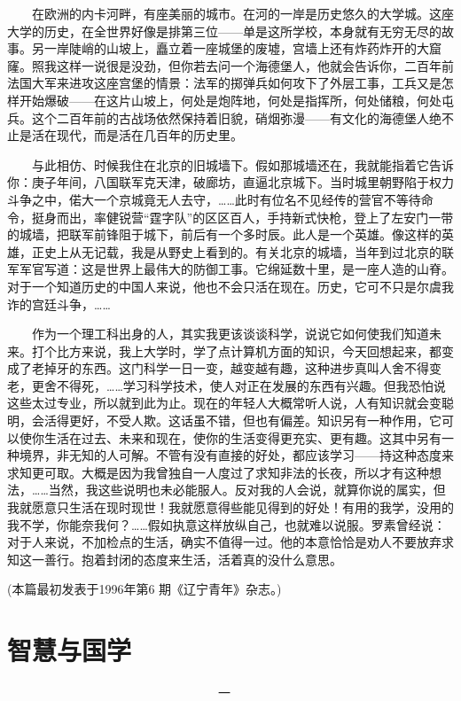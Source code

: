 　　在欧洲的内卡河畔，有座美丽的城市。在河的一岸是历史悠久的大学城。这座大学的历史，在全世界好像是排第三位——单是这所学校，本身就有无穷无尽的故事。另一岸陡峭的山坡上，矗立着一座城堡的废墟，宫墙上还有炸药炸开的大窟窿。照我这样一说很是没劲，但你若去问一个海德堡人，他就会告诉你，二百年前法国大军来进攻这座宫堡的情景：法军的掷弹兵如何攻下了外层工事，工兵又是怎样开始爆破——在这片山坡上，何处是炮阵地，何处是指挥所，何处储粮，何处屯兵。这个二百年前的古战场依然保持着旧貌，硝烟弥漫——有文化的海德堡人绝不止是活在现代，而是活在几百年的历史里。 

　　与此相仿、时候我住在北京的旧城墙下。假如那城墙还在，我就能指着它告诉你：庚子年间，八国联军克天津，破廊坊，直逼北京城下。当时城里朝野陷于权力斗争之中，偌大一个京城竟无人去守，……此时有位名不见经传的营官不等待命令，挺身而出，率健锐营“霆字队”的区区百人，手持新式快枪，登上了左安门一带的城墙，把联军前锋阻于城下，前后有一个多时辰。此人是一个英雄。像这样的英雄，正史上从无记载，我是从野史上看到的。有关北京的城墙，当年到过北京的联军军官写道：这是世界上最伟大的防御工事。它绵延数十里，是一座人造的山脊。对于一个知道历史的中国人来说，他也不会只活在现在。历史，它可不只是尔虞我诈的宫廷斗争，…… 

　　作为一个理工科出身的人，其实我更该谈谈科学，说说它如何使我们知道未来。打个比方来说，我上大学时，学了点计算机方面的知识，今天回想起来，都变成了老掉牙的东西。这门科学一日一变，越变越有趣，这种进步真叫人舍不得变老，更舍不得死，……学习科学技术，使人对正在发展的东西有兴趣。但我恐怕说这些太过专业，所以就到此为止。现在的年轻人大概常听人说，人有知识就会变聪明，会活得更好，不受人欺。这话虽不错，但也有偏差。知识另有一种作用，它可以使你生活在过去、未来和现在，使你的生活变得更充实、更有趣。这其中另有一种境界，非无知的人可解。不管有没有直接的好处，都应该学习——持这种态度来求知更可取。大概是因为我曾独自一人度过了求知非法的长夜，所以才有这种想法，……当然，我这些说明也未必能服人。反对我的人会说，就算你说的属实，但我就愿意只生活在现时现世！我就愿意得些能见得到的好处！有用的我学，没用的我不学，你能奈我何？……假如执意这样放纵自己，也就难以说服。罗素曾经说：对于人来说，不加检点的生活，确实不值得一过。他的本意恰恰是劝人不要放弃求知这一善行。抱着封闭的态度来生活，活着真的没什么意思。 

(本篇最初发表于1996年第6 期《辽宁青年》杂志。)

\chapter{智慧与国学}

　　　　　　　　　　　　　　　　　一　　　　　　　　　　　　　　　　　　　 

